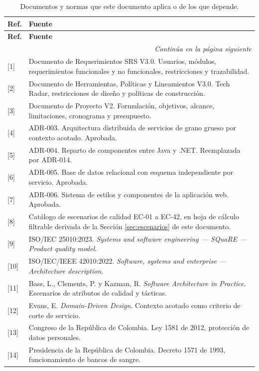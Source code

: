 \documentclass[11pt,a4paper]{article}
\newcommand{\contlinea}[1]{\multicolumn{#1}{r}{\footnotesize\itshape Continúa en la página siguiente}}
\begin{document}
\begin{longtable}{L{1.2cm} L{13.4cm}}
\caption{Documentos y normas que este documento aplica o de los que depende.}\label{tab:referencias}\\
\toprule
\textbf{Ref.} & \textbf{Fuente} \\
\midrule
\endfirsthead
\toprule
\textbf{Ref.} & \textbf{Fuente} \\
\midrule
\endhead
\midrule
\contlinea{2} \\
\endfoot
\bottomrule
\endlastfoot
{[1]} & Documento de Requerimientos SRS V3.0. Usuarios, módulos, requerimientos funcionales y no funcionales, restricciones y trazabilidad. \\
{[2]} & Documento de Herramientas, Políticas y Lineamientos V3.0. Tech Radar, restricciones de diseño y políticas de construcción. \\
{[3]} & Documento de Proyecto V2. Formulación, objetivos, alcance, limitaciones, cronograma y presupuesto. \\
{[4]} & ADR-003. Arquitectura distribuida de servicios de grano grueso por contexto acotado. Aprobada. \\
{[5]} & ADR-004. Reparto de componentes entre Java y .NET. Reemplazada por ADR-014. \\
{[6]} & ADR-005. Base de datos relacional con esquema independiente por servicio. Aprobada. \\
{[7]} & ADR-006. Sistema de estilos y componentes de la aplicación web. Aprobada. \\
{[8]} & Catálogo de escenarios de calidad EC-01 a EC-42, en hoja de cálculo filtrable derivada de la Sección \ref{sec:escenarios} de este documento. \\
{[9]} & ISO/IEC 25010:2023. \emph{Systems and software engineering --- SQuaRE --- Product quality model}. \\
{[10]} & ISO/IEC/IEEE 42010:2022. \emph{Software, systems and enterprise --- Architecture description}. \\
{[11]} & Bass, L., Clements, P. y Kazman, R. \emph{Software Architecture in Practice}. Escenarios de atributos de calidad y tácticas. \\
{[12]} & Evans, E. \emph{Domain-Driven Design}. Contexto acotado como criterio de corte de servicio. \\
{[13]} & Congreso de la República de Colombia. Ley 1581 de 2012, protección de datos personales. \\
{[14]} & Presidencia de la República de Colombia. Decreto 1571 de 1993, funcionamiento de bancos de sangre. \\

\end{longtable}
\end{document}
